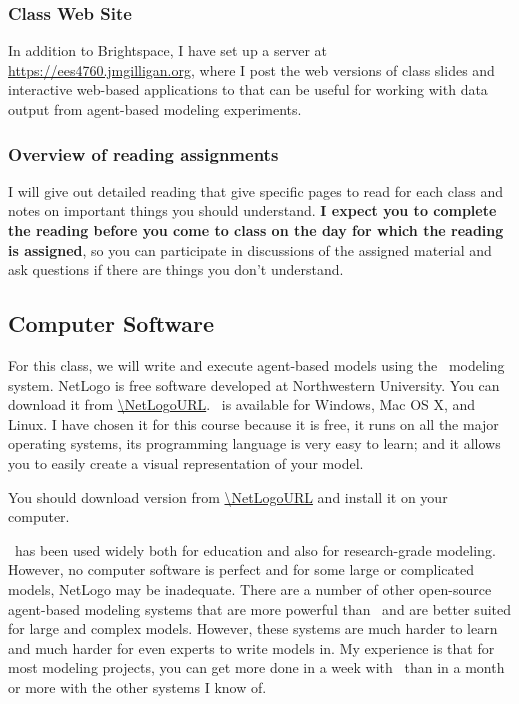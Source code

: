 \documentclass[11pt,twoside]{jgsyllabus}\usepackage[]{graphicx}\usepackage[]{xcolor}
\begin{document}
\subsubsection{Class Web Site}
In addition to Brightspace,
I have set up a server at \url{https://ees4760.jmgilligan.org}, where I post the
web versions of class slides and interactive web-based applications to that can
be useful for working with data output from agent-based modeling experiments.

\subsubsection{Overview of reading assignments}
I will give out detailed reading that give specific pages to read for each class
and notes on important things you should understand.
\textbf{I expect you to complete the reading before you come to class on the day
for which the reading is assigned}, so you can participate in discussions of the
assigned material and ask questions if there are things you don't understand.

\subsection{Computer Software}
For this class, we will write and execute agent-based models using the \NetLogo\
modeling system. NetLogo is free software developed at Northwestern University.
You can download it from \url{\NetLogoURL}.
\NetLogo\ is available for Windows, Mac OS X, and Linux.
I have chosen it for this course because it is free, it runs on all the major
operating systems, its programming language is very easy to learn; and it allows
you to easily create a visual representation of your model.

You should download \NetLogo{} version \NetLogoVersion{}
from
\url{\NetLogoURL}
and install it on your computer.

\NetLogo\ has been used widely both for education and also for research-grade
modeling. However, no computer software is perfect and for some large or
complicated models, NetLogo may be inadequate.
There are a number of other
open-source agent-based modeling systems that are more powerful than \NetLogo\
and are better suited for large and complex models. However, these systems are
much harder to learn and much harder for even experts to write models in.
My experience is that for most modeling projects, you can get more done in a
week with \NetLogo\ than in a month or more with the other systems I know of.
\end{document}
